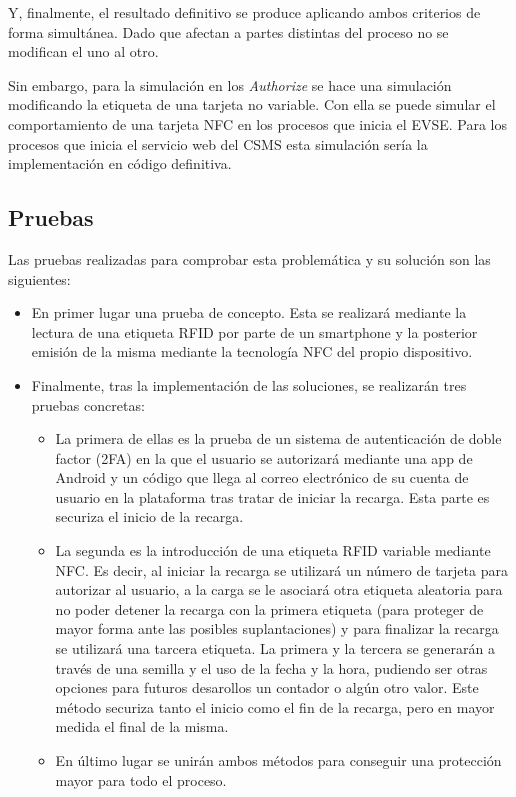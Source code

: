 \documentclass[12pt,a4paper,onecolumn,oneside]{report}
\begin{document}
Y, finalmente, el resultado definitivo se produce aplicando ambos criterios de forma simultánea. Dado que afectan a partes distintas del proceso no se modifican el uno al otro.

Sin embargo, para la simulación en los \textit{Authorize} se hace una simulación modificando la etiqueta de una tarjeta no variable. Con ella se puede simular el comportamiento de una tarjeta NFC en los procesos que inicia el EVSE. Para los procesos que inicia el servicio web del CSMS esta simulación sería la implementación en código definitiva.







\subsection{Pruebas}
\label{Pruebas}

Las pruebas realizadas para comprobar esta problemática y su solución son las siguientes:

\begin{itemize}
\item En primer lugar una prueba de concepto. Esta se realizará mediante la lectura de una etiqueta RFID por parte de un smartphone y la posterior emisión de la misma mediante la tecnología NFC del propio dispositivo.
\item Finalmente, tras la implementación de las soluciones, se realizarán tres pruebas concretas:
\begin{itemize}
\item La primera de ellas es la prueba de un sistema de autenticación de doble factor (2FA) en la que el usuario se autorizará mediante una app de Android y un código que llega al correo electrónico de su cuenta de usuario en la plataforma tras tratar de iniciar la recarga. Esta parte es securiza el inicio de la recarga.
\item La segunda es la introducción de una etiqueta RFID variable mediante NFC. Es decir, al iniciar la recarga se utilizará un número de tarjeta para autorizar al usuario, a la carga se le asociará otra etiqueta aleatoria para no poder detener la recarga con la primera etiqueta (para proteger de mayor forma ante las posibles suplantaciones) y para finalizar la recarga se utilizará una tarcera etiqueta. La primera y la tercera se generarán a través de una semilla y el uso de la fecha y la hora, pudiendo ser otras opciones para futuros desarollos un contador o algún otro valor. Este método securiza tanto el inicio como el fin de la recarga, pero en mayor medida el final de la misma.
\item En último lugar se unirán ambos métodos para conseguir una protección mayor para todo el proceso.

\end{itemize}

\end{itemize}
\end{document}
